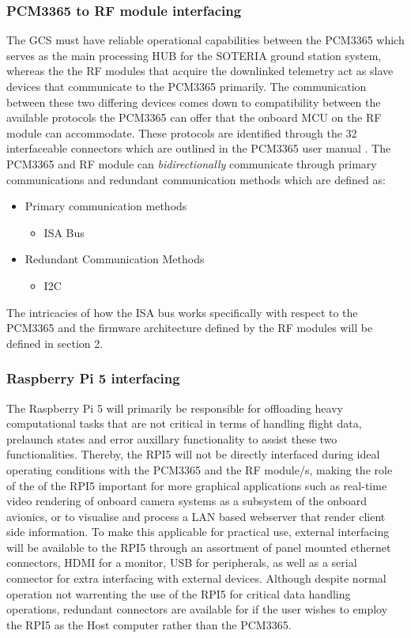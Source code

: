 \subsubsection{PCM3365 to RF module interfacing}
The GCS must have reliable operational capabilities between the PCM3365 which serves as the main processing HUB for the SOTERIA ground station system, whereas the the RF modules that acquire the downlinked telemetry act as slave devices that communicate to the PCM3365 primarily. The communication between these two differing devices comes down to compatibility between the available protocols the PCM3365 can offer that the onboard MCU on the RF module can accommodate. These protocols are identified through the 32 interfaceable connectors which are outlined in the PCM3365 user manual \cite{Reference_Manual}.
The PCM3365 and RF module can \textit{bidirectionally} communicate through primary communications and redundant communication methods which are defined as:
\begin{itemize}
    \item Primary communication methods
    \begin{itemize}
        \item ISA Bus
    \end{itemize}
    \item Redundant Communication Methods
      \begin{itemize}
        \item I2C
    \end{itemize}
\end{itemize}
The intricacies of how the ISA bus works specifically with respect to the PCM3365 and the firmware architecture defined by the RF modules will be defined in section 2. 
\pagebreak
\subsubsection{Raspberry Pi 5 interfacing}
The Raspberry Pi 5 will primarily be responsible for offloading heavy computational tasks that are not critical in terms of handling flight data, prelaunch states and error auxillary functionality to assist these two functionalities. Thereby, the RPI5 will not be directly interfaced during ideal operating conditions with the PCM3365 and the RF module/s, making the role of the of the RPI5 important for more graphical applications such as real-time video rendering of onboard camera systems as a subsystem of the onboard avionics, or to visualise and process a LAN based webserver that render client side information. To make this applicable for practical use, external interfacing will be available to the RPI5 through an assortment of panel mounted ethernet connectors, HDMI for a monitor, USB for peripherals, as well as a serial connector for extra interfacing with external devices. Although despite normal operation not warrenting the use of the RPI5 for critical data handling operations, redundant connectors are available for if the user wishes to employ the RPI5 as the Host computer rather than the PCM3365.
